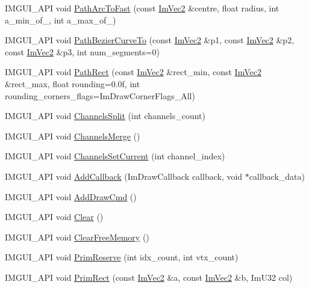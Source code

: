 \begin{DoxyCompactItemize}
\item 
I\+M\+G\+U\+I\+\_\+\+A\+PI void \hyperlink{struct_im_draw_list_a713cca3862e88aa1ee671db1c4cf6bdb}{Path\+Arc\+To\+Fast} (const \hyperlink{struct_im_vec2}{Im\+Vec2} \&centre, float radius, int a\+\_\+min\+\_\+of\+\_, int a\+\_\+max\+\_\+of\+\_)
\item 
I\+M\+G\+U\+I\+\_\+\+A\+PI void \hyperlink{struct_im_draw_list_a495ca7dd4fd5a898e2414658321f4b18}{Path\+Bezier\+Curve\+To} (const \hyperlink{struct_im_vec2}{Im\+Vec2} \&p1, const \hyperlink{struct_im_vec2}{Im\+Vec2} \&p2, const \hyperlink{struct_im_vec2}{Im\+Vec2} \&p3, int num\+\_\+segments=0)
\item 
I\+M\+G\+U\+I\+\_\+\+A\+PI void \hyperlink{struct_im_draw_list_a6664e5392e7cca67fd95c4dc0eae7569}{Path\+Rect} (const \hyperlink{struct_im_vec2}{Im\+Vec2} \&rect\+\_\+min, const \hyperlink{struct_im_vec2}{Im\+Vec2} \&rect\+\_\+max, float rounding=0.\+0f, int rounding\+\_\+corners\+\_\+flags=\+Im\+Draw\+Corner\+Flags\+\_\+\+All)
\item 
I\+M\+G\+U\+I\+\_\+\+A\+PI void \hyperlink{struct_im_draw_list_a426f124ba049bed2d38c850c65f9f917}{Channels\+Split} (int channels\+\_\+count)
\item 
I\+M\+G\+U\+I\+\_\+\+A\+PI void \hyperlink{struct_im_draw_list_a2ed82c3f663cda520c90c55b94196274}{Channels\+Merge} ()
\item 
I\+M\+G\+U\+I\+\_\+\+A\+PI void \hyperlink{struct_im_draw_list_a7de44b9fdfce65f32063ecad9306a191}{Channels\+Set\+Current} (int channel\+\_\+index)
\item 
I\+M\+G\+U\+I\+\_\+\+A\+PI void \hyperlink{struct_im_draw_list_a14073d60ef9db9dc663dc7717a4893a5}{Add\+Callback} (Im\+Draw\+Callback callback, void $\ast$callback\+\_\+data)
\item 
I\+M\+G\+U\+I\+\_\+\+A\+PI void \hyperlink{struct_im_draw_list_a846714bb0321c6f1f908767abc8559e6}{Add\+Draw\+Cmd} ()
\item 
I\+M\+G\+U\+I\+\_\+\+A\+PI void \hyperlink{struct_im_draw_list_ac422590c71dc5593aea52f65793aee81}{Clear} ()
\item 
I\+M\+G\+U\+I\+\_\+\+A\+PI void \hyperlink{struct_im_draw_list_a8b2686e006f57c554b709dfc47e2ad63}{Clear\+Free\+Memory} ()
\item 
I\+M\+G\+U\+I\+\_\+\+A\+PI void \hyperlink{struct_im_draw_list_a879aa38dbfb0344e3e023d65c002c7d7}{Prim\+Reserve} (int idx\+\_\+count, int vtx\+\_\+count)
\item 
I\+M\+G\+U\+I\+\_\+\+A\+PI void \hyperlink{struct_im_draw_list_ae2be093563f1d20b8190b7c423113925}{Prim\+Rect} (const \hyperlink{struct_im_vec2}{Im\+Vec2} \&a, const \hyperlink{struct_im_vec2}{Im\+Vec2} \&b, Im\+U32 col)

\end{DoxyCompactItemize}
